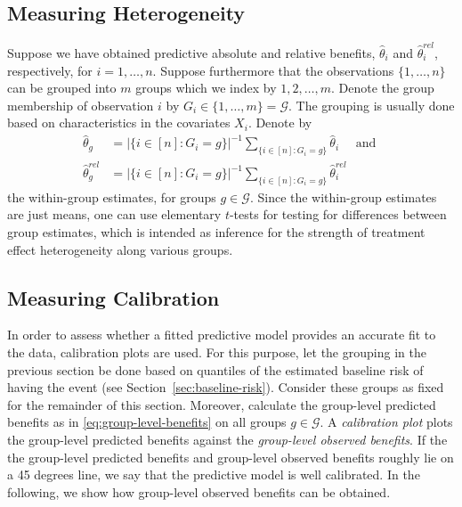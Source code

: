 \documentclass[11pt]{article}
\begin{document}
\subsection{Measuring Heterogeneity}
Suppose we have obtained predictive absolute and relative benefits, $\widehat{\theta}_i$ and $\widehat{\theta}^{rel}_i$, respectively, for $i=1,\dots,n$. Suppose furthermore that the observations $\{1,\dots,n\}$ can be grouped into $m$ groups which we index by $1,2,\dots,m$. Denote the group membership of observation $i$ by $G_i \in \{1,\dots,m\} = \mathcal{G}$. The grouping is usually done based on characteristics in the covariates $X_i$. Denote by 
\begin{equation} \label{eq:group-level-benefits}
\begin{split}
    \widehat{\theta}_g 
    &=
    |\{i\in [n]:G_i = g\}|^{-1}
    \sum_{\{i\in [n]:G_i = g\}}
    \widehat{\theta}_i \quad \text{ and }
    \\
    \widehat{\theta}^{rel}_g 
    &=
    |\{i\in [n]:G_i = g\}|^{-1}
    \sum_{\{i\in [n]:G_i = g\}}
    \widehat{\theta}_i^{rel}
\end{split}
\end{equation}
the within-group estimates, for groups $g\in\mathcal{G}$. Since the within-group estimates are just means, one can use elementary $t$-tests for testing for differences between group estimates, which is intended as inference for the strength of treatment effect heterogeneity along various groups. 

\subsection{Measuring Calibration}
In order to assess whether a fitted predictive model provides an accurate fit to the data, calibration plots are used. For this purpose, let the grouping in the previous section be done based on quantiles of the estimated baseline risk of having the event (see Section~\ref{sec:baseline-risk}). Consider these groups as fixed for the remainder of this section. Moreover, calculate the group-level predicted benefits as in \eqref{eq:group-level-benefits} on all groups $g\in\mathcal{G}$. A \textit{calibration plot} plots the group-level predicted benefits against the \textit{group-level observed benefits}. If the the group-level predicted benefits and group-level observed benefits roughly lie on a 45 degrees line, we say that the predictive model is well calibrated. In the following, we show how group-level observed benefits can be obtained.
\end{document}
